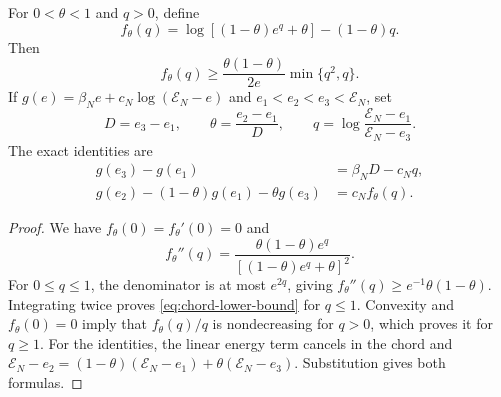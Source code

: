 \begin{lemma}
\label{lem:chord}
For $0<\theta<1$ and $q>0$, define
\begin{equation}
 f_\theta(q)=\log[(1-\theta)e^q+\theta]-(1-\theta)q.
 \label{eq:chord-function}
\end{equation}
Then
\begin{equation}
 f_\theta(q)\ge\frac{\theta(1-\theta)}{2e}
                  \min\{q^2,q\}.
 \label{eq:chord-lower-bound}
\end{equation}
If $g(e)=\beta_N e+c_N\log(\mathcal E_N-e)$ and
$e_1<e_2<e_3<\mathcal E_N$, set
\begin{equation}
 D=e_3-e_1,\qquad \theta=\frac{e_2-e_1}{D},\qquad
 q=\log\frac{\mathcal E_N-e_1}{\mathcal E_N-e_3}.
 \label{eq:three-point-parameters}
\end{equation}
The exact identities are
\begin{align}
 g(e_3)-g(e_1)&=\beta_ND-c_Nq,
 \label{eq:endpoint-identity}\\
 g(e_2)-(1-\theta)g(e_1)-\theta g(e_3)&=c_Nf_\theta(q).
 \label{eq:chord-identity}
\end{align}
\end{lemma}
\begin{proof}
We have $f_\theta(0)=f_\theta'(0)=0$ and
\[
 f_\theta''(q)=\frac{\theta(1-\theta)e^q}
 {[(1-\theta)e^q+\theta]^2}.
\]
For $0\le q\le1$, the denominator is at most $e^{2q}$, giving
$f_\theta''(q)\ge e^{-1}\theta(1-\theta)$. Integrating twice proves
\eqref{eq:chord-lower-bound} for $q\le1$. Convexity and
$f_\theta(0)=0$ imply that $f_\theta(q)/q$ is nondecreasing for $q>0$,
which proves it for $q\ge1$. For the identities, the linear energy
term cancels in the chord and
$\mathcal E_N-e_2=(1-\theta)(\mathcal E_N-e_1)
 +\theta(\mathcal E_N-e_3)$. Substitution gives both formulas.
\end{proof}


